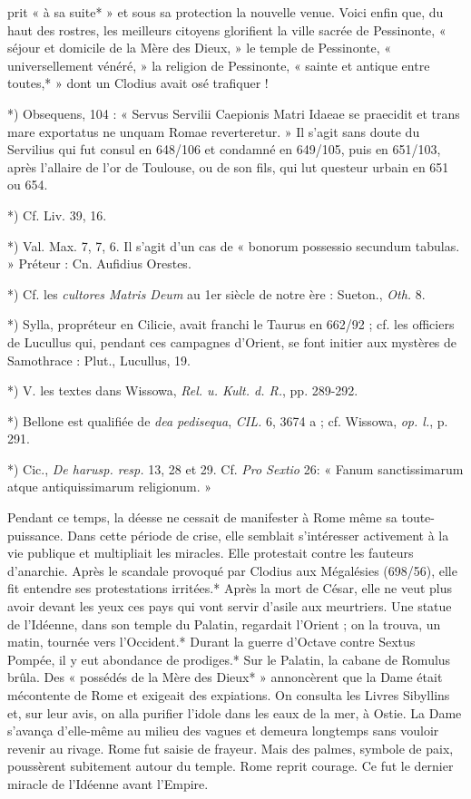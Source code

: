 \documentclass[a4paper, 11pt, oneside, polutonikogreek, french]{article}
\begin{document}
prit « à sa suite* » et sous sa protection la nouvelle venue. Voici enfin que, du haut des rostres, les meilleurs citoyens glorifient la ville sacrée de Pessinonte, « séjour et domicile de la Mère des Dieux, » le temple de Pessinonte, « universellement vénéré, » la religion de Pessinonte, « sainte et antique entre toutes,* » dont un Clodius avait osé trafiquer !

*) Obsequens, 104 : « Servus Servilii Caepionis Matri Idaeae se praecidit et trans mare exportatus ne unquam Romae reverteretur. » Il s'agit sans doute du Servilius qui fut consul en 648/106 et condamné en 649/105, puis en 651/103, après l'allaire de l'or de Toulouse, ou de son fils, qui lut questeur urbain en 651 ou 654.

*) Cf. Liv. 39, 16.

*) Val. Max. 7, 7, 6. Il s'agit d'un cas de « bonorum possessio secundum tabulas. » Préteur : Cn. Aufidius Orestes.

*) Cf. les \emph{cultores Matris Deum} au 1er siècle de notre ère : Sueton., \emph{Oth.} 8.

*) Sylla, propréteur en Cilicie, avait franchi le Taurus en 662/92 ; cf. les officiers de Lucullus qui, pendant ces campagnes d'Orient, se font initier aux mystères de Samothrace : Plut., Lucullus, 19.

*) V. les textes dans Wissowa, \emph{Rel. u. Kult. d. R.}, pp. 289-292.

*) Bellone est qualifiée de \emph{dea pedisequa}, \emph{CIL.} 6, 3674 a ; cf. Wissowa, \emph{op. l.}, p. 291.

*) Cic., \emph{De harusp. resp.} 13, 28 et 29. Cf. \emph{Pro Sextio} 26: « Fanum sanctissimarum atque antiquissimarum religionum. »

Pendant ce temps, la déesse ne cessait de manifester à Rome même sa toute-puissance. Dans cette période de crise, elle semblait s'intéresser activement à la vie publique et multipliait les miracles. Elle protestait contre les fauteurs d'anarchie. Après le scandale provoqué par Clodius aux Mégalésies (698/56), elle fit entendre ses protestations irritées.* Après la mort de César, elle ne veut plus avoir devant les yeux ces pays qui vont servir d'asile aux meurtriers. Une statue de l'Idéenne, dans son temple du Palatin, regardait l'Orient ; on la trouva, un matin, tournée vers l'Occident.* Durant la guerre d'Octave contre Sextus Pompée, il y eut abondance de prodiges.* Sur le Palatin, la cabane de Romulus brûla. Des « possédés de la Mère des Dieux* » annoncèrent que la Dame était mécontente de Rome et exigeait des expiations. On consulta les Livres Sibyllins et, sur leur avis, on alla purifier l'idole dans les eaux de la mer, à Ostie. La Dame s'avança d'elle-même au milieu des vagues et demeura longtemps sans vouloir revenir au rivage. Rome fut saisie de frayeur. Mais des palmes, symbole de paix, poussèrent subitement autour du temple. Rome reprit courage. Ce fut le dernier miracle de l'Idéenne avant l'Empire.
\end{document}
